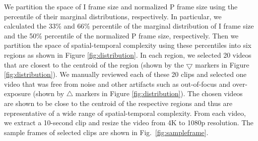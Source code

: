 \documentclass{sig-alternate}
\begin{document}
We partition the space of I frame size and normalized P frame size using the percentile of their marginal distributions, respectively. In particular, we calculated the 33\% and 66\% percentile of the marginal distribution of I frame size and the 50\% percentile of the normalized P frame size, respectively. Then we partition the space of spatial-temporal complexity using these percentiles into six regions as shown in Figure \ref{fig:distribution}. In each region, we selected 20 videos that are closest to the centroid of the region (shown by the $\bigtriangledown$ markers in Figure \ref{fig:distribution}). We manually reviewed each of these 20 clips and selected one video that was free from noise and other artifacts such as out-of-focus and over-exposure (shown by $\triangle$ markers in Figure \ref{fig:distribution}). The chosen videos are shown to be close to the centroid of the respective regions and thus are representative of a wide range of spatial-temporal complexity. From each video, we extract a 10-second clip and resize the video from 4K to 1080p resolution. The sample frames of selected clips are shown in Fig.~\ref{fig:sampleframe}.
\end{document}
